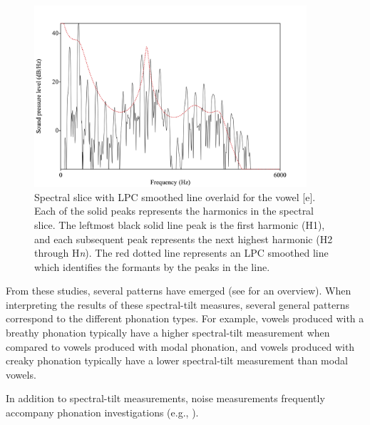 \documentclass[12pt, letterpaper]{article}
\begin{document}
\begin{figure}[!h]
	\centering
	\includegraphics[width=0.9\textwidth]{Images/Harmonics.png}
	\caption{Spectral slice with LPC smoothed line overlaid for the vowel [e]. Each of the solid peaks represents the harmonics in the spectral slice. The leftmost black solid line peak is the first harmonic (H1), and each subsequent peak represents the next highest harmonic (H2 through H\textit{n}). The red dotted line represents an LPC smoothed line which identifies the formants by the peaks in the line.}
	\label{fig:Harmonics}
\end{figure}

From these studies, several patterns have emerged (see \cite{garellekPhoneticsVoice2019} for an overview). When interpreting the results of these spectral-tilt measures, several general patterns correspond to the different phonation types. For example, vowels produced with a breathy phonation typically have a higher spectral-tilt measurement when compared to vowels produced with modal phonation, and vowels produced with creaky phonation typically have a lower spectral-tilt measurement than modal vowels. 

In addition to spectral-tilt measurements, noise measurements frequently accompany phonation investigations (e.g., \cite{garellekPhoneticsWhiteHmong2021}). 
\end{document}

